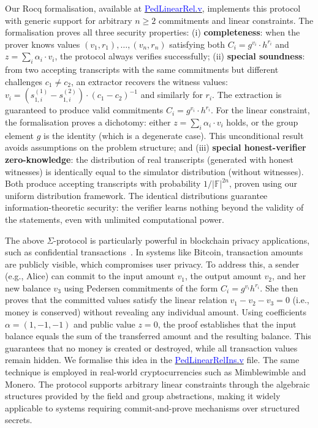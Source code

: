 \documentclass[sigconf,anonymous,review]{acmart}
\begin{document}
Our Rocq formalisation, available at \href{https://anonymous.4open.science/r/SigmaProtocol-EBA5/src/Crypto/PedLinearRel.v}{\textcolor{blue}{PedLinearRel.v}}, implements this protocol with generic support for arbitrary $n \geq 2$ commitments and linear constraints. The formalisation proves all three security properties: (i) \textbf{completeness}: when the prover knows values $(v_1, r_1), \ldots, (v_n, r_n)$ satisfying both $C_i = g^{v_i} \cdot h^{r_i}$ and $z = \sum_i \alpha_i \cdot v_i$, the protocol always verifies successfully; (ii) \textbf{special soundness}: from two accepting transcripts with the same commitments but different challenges $c_1 \neq c_2$, 
an extractor recovers the witness values: $v_i = (s_{1,i}^{(1)} - s_{1,i}^{(2)}) \cdot (c_1 - c_2)^{-1}$ 
and similarly for $r_i$. The extraction is guaranteed to produce valid commitments $C_i = g^{v_i} \cdot h^{r_i}$. 
For the linear constraint, the formalisation proves a dichotomy: either $z = \sum_i \alpha_i \cdot v_i$ holds, 
or the group element $g$ is the identity (which is a degenerate case). This unconditional result avoids 
assumptions on the problem structure; and (iii) \textbf{special honest-verifier zero-knowledge}: 
the distribution of real transcripts (generated with honest witnesses) is identically equal to the 
simulator distribution (without witnesses). Both produce accepting transcripts with probability 
$1/|\mathbb{F}|^{2n}$, proven using our uniform distribution framework. The identical distributions 
guarantee information-theoretic security: the verifier learns nothing beyond the validity of the 
statements, even with unlimited computational power.

The above $\Sigma$-protocol is particularly powerful in blockchain privacy applications, such as confidential transactions~\cite{10.1007/978-3-030-17653-2_22}. In systems like Bitcoin, transaction amounts are publicly visible, which compromises user privacy. To address this, a sender (e.g., Alice) can commit to the input amount $v_1$, the output amount $v_2$, and her new balance $v_3$ using Pedersen commitments of the form $C_i = g^{v_i} h^{r_i}$. She then proves that the committed values satisfy the linear relation $v_1 - v_2 - v_3 = 0$ (i.e., money is conserved) without revealing any individual amount. Using coefficients $\alpha = (1, -1, -1)$ and public value $z = 0$, the proof establishes that the input balance equals the sum of the transferred amount and the resulting balance. This guarantees that no money is created or destroyed, while all transaction values remain hidden. We formalise this idea in the \href{https://anonymous.4open.science/r/SigmaProtocol-EBA5/src/Examples/PedLinearRelIns.v}{\textcolor{blue}{PedLinearRelIns.v}} file. The same technique is employed in real-world cryptocurrencies such as Mimblewimble and Monero. The protocol supports arbitrary linear constraints through the algebraic structures provided by the field and group abstractions, making it widely applicable to systems requiring commit-and-prove mechanisms over structured secrets.
\end{document}
